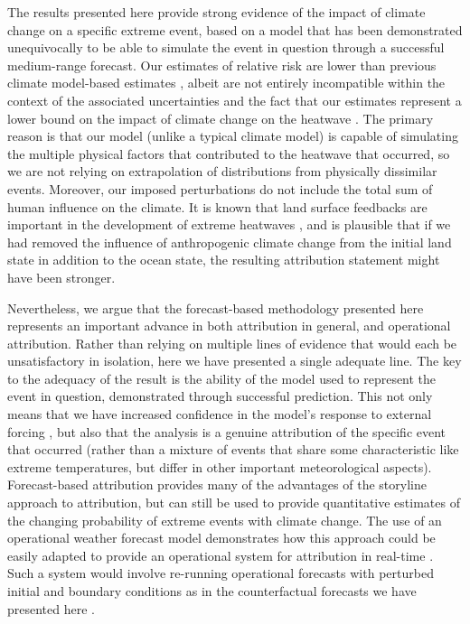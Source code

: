   The results presented here provide strong evidence of the impact of climate change on a specific extreme event, based on a model that has been demonstrated unequivocally to be able to simulate the event in question through a successful medium-range forecast. Our estimates of relative risk are lower than previous climate model-based estimates \cite{philip_rapid_2021}, albeit are not entirely incompatible within the context of the associated uncertainties and the fact that our estimates represent a lower bound on the impact of climate change on the heatwave \cite[as was the case in][]{leach_forecast-based_2021}. The primary reason is that our model (unlike a typical climate model) is capable of simulating the multiple physical factors that contributed to the heatwave that occurred, so we are not relying on extrapolation of distributions from physically dissimilar events. Moreover, our imposed perturbations do not include the total sum of human influence on the climate. It is known that land surface feedbacks are important in the development of extreme heatwaves \cite{fischer_contribution_2007}, and is plausible that if we had removed the influence of anthropogenic climate change from the initial land state in addition to the ocean state, the resulting attribution statement might have been stronger.

  Nevertheless, we argue that the forecast-based methodology presented here represents an important advance in both attribution in general, and operational attribution. Rather than relying on multiple lines of evidence that would each be unsatisfactory in isolation, here we have presented a single adequate line. The key to the adequacy of the result is the ability of the model used to represent the event in question, demonstrated through successful prediction. This not only means that we have increased confidence in the model's response to external forcing \cite{palmer_simple_2018,palmer_nonlinear_1999}, but also that the analysis is a genuine attribution of the specific event that occurred (rather than a mixture of events that share some characteristic like extreme temperatures, but differ in other important meteorological aspects). Forecast-based attribution provides many of the advantages of the storyline approach to attribution, but can still be used to provide quantitative estimates of the changing probability of extreme events with climate change. The use of an operational weather forecast model demonstrates how this approach could be easily adapted to provide an operational system for attribution in real-time \cite[or potentially even in advance,][]{wang_initialized_2021}. Such a system would involve re-running operational forecasts with perturbed initial and boundary conditions as in the counterfactual forecasts we have presented here \cite{wehner_operational_2022}.

